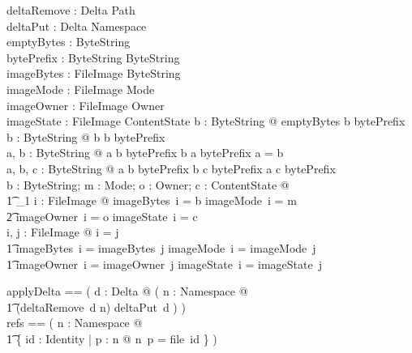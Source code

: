 \documentclass{article}
\begin{document}
\begin{axdef}
	deltaRemove : Delta \fun \power Path \\
	deltaPut : Delta \fun Namespace \\
	emptyBytes : ByteString \\
	bytePrefix : ByteString \rel ByteString \\
	imageBytes : FileImage \fun ByteString \\
	imageMode : FileImage \fun Mode \\
	imageOwner : FileImage \fun Owner \\
	imageState : FileImage \fun ContentState
	\where
	\forall b : ByteString @ emptyBytes \mapsto b \in bytePrefix \\
	\forall b : ByteString @ b \mapsto b \in bytePrefix \\
	\forall a, b : ByteString @ a \mapsto b \in bytePrefix \land
	b \mapsto a \in bytePrefix \implies a = b \\
	\forall a, b, c : ByteString @ a \mapsto b \in bytePrefix \land
	b \mapsto c \in bytePrefix \implies a \mapsto c \in bytePrefix \\
	\forall b : ByteString; m : Mode; o : Owner; c : ContentState @ \\
	\t1 \exists_1 i : FileImage @ imageBytes~i = b \land imageMode~i = m \land \\
	\t2 imageOwner~i = o \land imageState~i = c \\
	\forall i, j : FileImage @ i = j \iff \\
	\t1 imageBytes~i = imageBytes~j \land imageMode~i = imageMode~j \land \\
	\t1 imageOwner~i = imageOwner~j \land imageState~i = imageState~j
\end{axdef}

\begin{zed}
	applyDelta == ( \lambda d : Delta @ ( \lambda n : Namespace @ \\
	\t1 (deltaRemove~d \ndres n) \oplus deltaPut~d ) ) \\
	refs == ( \lambda n : Namespace @ \\
	\t1 \{ id : Identity | \exists p : \dom n @ n~p = file~id \} )
\end{zed}
\end{document}
